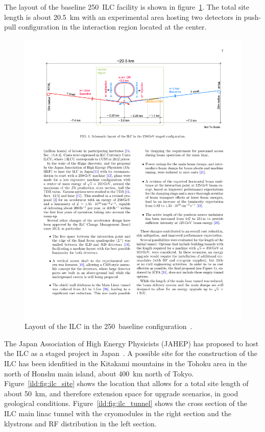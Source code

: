 The layout of the baseline 250~\GeV ILC facility is shown in figure~\ref{ild:fig:ilc_footprint}. The total site length is about 20.5~km with an experimental area hosting two detectors in push-pull configuration in the interaction region located at the center.
\begin{figure}[h!]
\centering
\includegraphics[width=0.9\hsize]{ILC/figs/ILC_Footprint.pdf}

\caption{\label{ild:fig:ilc_footprint}Layout of the ILC in the 250~\GeV baseline configuration~\cite{Bambade:2019fyw}.}
\end{figure}
The Japan Association of High Energy Physicists (JAHEP) has proposed to host the ILC as a staged project in Japan~\cite{ild:bib:JAHEP}. A possible site for the construction of the ILC has been idenfitied in the Kitakami mountains in the Tohoku area in the north of Honshu main island, about 400~km north of Tokyo. Figure~\ref{ild:fig:ilc_site} shows the location that allows for a total site length of about 50~km, and therefore extension space for upgrade scenarios, in good geological conditions. Figure~\ref{ild:fig:ilc_tunnel} shows the cross section of the ILC main linac tunnel with the cryomodules in the right section and the klystrons and RF distribution in the left section.
